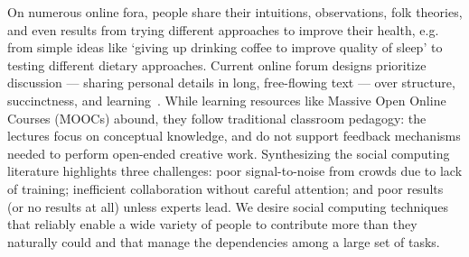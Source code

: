 On numerous online fora, people share their intuitions, observations, folk theories, and even results from trying different approaches to improve their health, e.g. from simple ideas like ‘giving up drinking coffee to improve quality of sleep’ to testing different dietary approaches. 
Current online forum
designs prioritize discussion — sharing personal details in
long, free-flowing text — over structure, succinctness, and learning~\cite{Thomas2002}. While learning resources like Massive Open Online Courses (MOOCs) abound, they follow traditional classroom pedagogy: the lectures focus on conceptual knowledge, and do not support feedback mechanisms needed to perform open-ended creative work. Synthesizing the social computing literature highlights three challenges: poor signal-to-noise from crowds due 
to lack of training; inefficient collaboration without careful attention; and poor results (or no results at all) 
unless experts lead. We desire social computing techniques that reliably enable a wide variety of people to contribute more than they naturally could 
and that manage the dependencies among a large set of tasks. 





